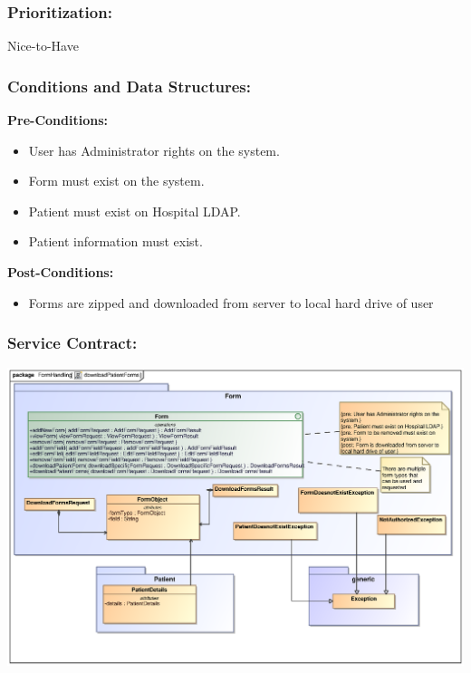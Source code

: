 \subsubsection{Prioritization:}
Nice-to-Have
\subsubsection{Conditions and Data Structures:}
\textbf{Pre-Conditions:}
\begin{itemize}
	\item User has Administrator rights on the system.
	\item Form must exist on the system.
	\item Patient must exist on Hospital LDAP.
	\item Patient information must exist.
\end{itemize}

\textbf{Post-Conditions:}	
\begin{itemize}
	\item Forms are zipped and downloaded from server to local hard drive of user
\end{itemize}
\subsubsection{Service Contract:} 
\includegraphics[width=1\linewidth]{./Graphics/FormUseCaseDiagrams/downloadPatientForms}
